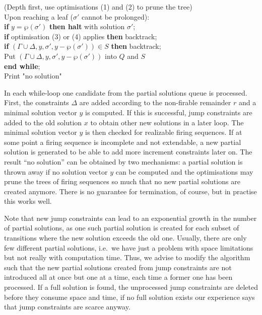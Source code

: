 \documentclass{LMCS}
\newcommand{\parikh}{\wp}
\begin{document}
{{\hspace*{6mm} (Depth first, use optimisations (1) and (2) to prune the tree)\\ 
\hspace*{6mm} Upon reaching a leaf ($\sigma'$ cannot be prolonged):\\
\hspace*{9mm} {\bf if} $y=\parikh(\sigma')$ {\bf then halt} with solution $\sigma'$;\\
\hspace*{9mm} {\bf if} optimisation (3) or (4) applies {\bf then} backtrack;\\ 
\hspace*{9mm} {\bf if} $(\Gamma\cup\Delta,y,\sigma',y-\parikh(\sigma'))\in S$ {\bf then} backtrack;\\
\hspace*{9mm} Put $(\Gamma\cup\Delta,y,\sigma',y-\parikh(\sigma'))$ into $Q$ and $S$\\
{\bf end while};\\
Print "no solution"
}}\smallskip

In each while-loop one candidate from the partial solutions queue is processed. First, the constraints $\Delta$
are added according to the non-firable remainder $r$ and a minimal solution vector $y$ is computed.
If this is successful, jump constraints are added to the old solution $x$ to obtain other new solutions
in a later loop. The minimal solution vector $y$ is then checked for realizable firing sequences.
If at some point a firing sequence is incomplete and not extendable, a new partial solution is
generated to be able to add more increment constraints later on. The result ``no solution''
can be obtained by two mechanisms: a partial solution is thrown away if no solution vector $y$
can be computed and the optimisations may prune the trees of firing sequences so much that no
new partial solutions are created anymore. There is no guarantee for termination, of course,
but in practise this works well.

Note that new jump constraints can lead to an exponential growth in the number of partial solutions,
as one such partial solution is created for each subset of transitions where the new solution
exceeds the old one. Usually, there are only few different partial solutions, i.e.\ we have just a
problem with space limitations but not really with computation time. Thus, we advise to modify the algorithm
such that the new partial solutions created from jump constraints are not introduced all at once but one at a time, each time
a former one has been processed. If a full solution is found, the unprocessed jump constraints
are deleted before they consume space and time, if no full solution exists our experience says
that jump constraints are scarce anyway.
\end{document}

